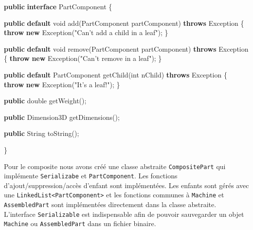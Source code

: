 \documentclass[french,]{article}
\newenvironment{Shaded}{}{}
\newcommand{\KeywordTok}[1]{\textcolor[rgb]{0.00,0.44,0.13}{\textbf{#1}}}
\newcommand{\DataTypeTok}[1]{\textcolor[rgb]{0.56,0.13,0.00}{#1}}
\newcommand{\StringTok}[1]{\textcolor[rgb]{0.25,0.44,0.63}{#1}}
\newcommand{\FunctionTok}[1]{\textcolor[rgb]{0.02,0.16,0.49}{#1}}
\newcommand{\BuiltInTok}[1]{#1}
\newcommand{\NormalTok}[1]{#1}
\begin{document}
\begin{Shaded}
\begin{Highlighting}[]
\KeywordTok{public} \KeywordTok{interface}\NormalTok{ PartComponent \{}

 \KeywordTok{public} \KeywordTok{default} \DataTypeTok{void} \FunctionTok{add}\NormalTok{(PartComponent partComponent) }\KeywordTok{throws} \BuiltInTok{Exception}\NormalTok{ \{}
  \KeywordTok{throw} \KeywordTok{new} \BuiltInTok{Exception}\NormalTok{(}\StringTok{"Can't add a child in a leaf"}\NormalTok{);}
\NormalTok{ \}}

 \KeywordTok{public} \KeywordTok{default} \DataTypeTok{void} \FunctionTok{remove}\NormalTok{(PartComponent partComponent) }\KeywordTok{throws} \BuiltInTok{Exception}\NormalTok{ \{}
  \KeywordTok{throw} \KeywordTok{new} \BuiltInTok{Exception}\NormalTok{(}\StringTok{"Can't remove in a leaf"}\NormalTok{);}
\NormalTok{ \}}

 \KeywordTok{public} \KeywordTok{default}\NormalTok{ PartComponent }\FunctionTok{getChild}\NormalTok{(}\DataTypeTok{int}\NormalTok{ nChild) }\KeywordTok{throws} \BuiltInTok{Exception}\NormalTok{ \{}
  \KeywordTok{throw} \KeywordTok{new} \BuiltInTok{Exception}\NormalTok{(}\StringTok{"It's a leaf!"}\NormalTok{);}
\NormalTok{ \}}

 \KeywordTok{public} \DataTypeTok{double} \FunctionTok{getWeight}\NormalTok{();}

 \KeywordTok{public}\NormalTok{ Dimension3D }\FunctionTok{getDimensions}\NormalTok{();}

 \KeywordTok{public} \BuiltInTok{String} \FunctionTok{toString}\NormalTok{();}

\NormalTok{\}}
\end{Highlighting}
\end{Shaded}

Pour le composite nous avons créé une classe abstraite
\texttt{CompositePart} qui implémente \texttt{Serializabe} et
\texttt{PartComponent}. Les fonctions d'ajout/suppression/accès d'enfant
sont implémentées. Les enfants sont gérés avec une
\texttt{LinkedList\textless{}PartComponent\textgreater{}} et les
fonctions communes à \texttt{Machine} et \texttt{AssembledPart} sont
implémentées directement dans la classe abstraite. L'interface
\texttt{Serializable} est indispensable afin de pouvoir sauvegarder un
objet \texttt{Machine} ou \texttt{AssembledPart} dans un fichier
binaire.
\end{document}
